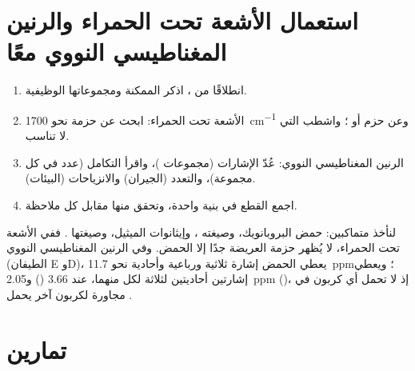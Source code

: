 \section{استعمال الأشعة تحت الحمراء والرنين المغناطيسي النووي معًا}


\begin{method}\label{met:g12:proton-nmr:identify}
\begin{enumerate}
  \item انطلاقًا من ، اذكر  الممكنة
        ومجموعاتها الوظيفية.
  \item الأشعة تحت الحمراء: ابحث عن حزمة  نحو \qty{1700}{cm^{-1}}
        وعن حزم  أو ؛ واشطب  التي
        لا تناسب.
  \item الرنين المغناطيسي النووي: عُدّ الإشارات (مجموعات )، واقرأ
        التكامل (عدد  في كل مجموعة)، والتعدد (الجيران)
        والانزياحات (البيئات).
  \item اجمع القطع في بنية واحدة، وتحقق منها مقابل كل
        ملاحظة.
\end{enumerate}
\end{method}

\begin{example}[متماكبان \ce{C3H6O2}]\label{ex:g12:proton-nmr:isomers}
لنأخذ متماكبين: حمض البروبانويك، وصيغته ، وإيثانوات الميثيل،
وصيغتها . ففي الأشعة تحت الحمراء، لا يُظهر حزمة  العريضة جدًا إلا
الحمض. وفي الرنين المغناطيسي النووي (الطيفان E وD)، يعطي الحمض إشارة ثلاثية ورباعية
وأحادية نحو \qty{11.7}{ppm}؛ ويعطي  إشارتين أحاديتين لثلاثة 
لكل منهما، عند 3.66 () و\qty{2.05}{ppm} ()، إذ لا
تحمل أي  كربون في   مجاورة لكربون آخر يحمل .
\end{example}

\section{تمارين}

